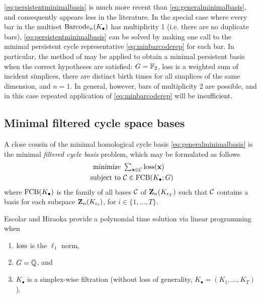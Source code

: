 \pr \eqref{eq:persistentminimalbasis} is much more recent than \pr \eqref{eq:generalminimalbasis}, and consequently appears less in the literature. In the special case where every bar in the multiset $\mathrm{Barcode}_n(K_\bullet)$ has multiplicity 1 (i.e. there are no duplicate bars), \pr \eqref{eq:persistentminimalbasis} can be solved by making one call to the minimal persistent cycle representative \pr \eqref{eq:minbarcoderep} for each bar.   In particular, the method of \cite{chenquantifying} may be applied to obtain a minimal persistent basis when the correct hypotheses are satisfied: $G = \mathbb{F}_2$, loss is a weighted sum of incident simplices, there are distinct birth times for all simplices of the same dimension, and $n=1$. In general, however, bars of multiplicity 2 are possible, and in this case repeated application of \pr \eqref{eq:minbarcoderep} will be insufficient.  

\subsection{Minimal filtered cycle space bases}

A close cousin of the minimal homological cycle basis \pr \eqref{eq:generalminimalbasis} is the minimal \emph{filtered cycle basis} problem, which may be formulated as  follows
\begin{align}
   \begin{split}
    \text{minimize } & \textstyle \sum_{\mathbf{x} \in \mathcal{C}} \mathrm{loss}(\mathbf{x}) \\
    \text{ subject to } & \mathcal{C} \in \mathrm{FCB}(K_\bullet ; G)
   \end{split}
   \label{eq:filteredminimalbasis}
\end{align}
where $\mathrm{FCB}(K_\bullet)$ is the family of all bases $\mathcal{C}$ of $\mathbf{Z}_n(K_{\epsilon_T})$ such that $\mathcal{C}$ contains a basis for each  subspace $\mathbf{Z}_n(K_{\epsilon_i})$, for $i \in \{1, \ldots, T\}$.  

Escolar and Hiraoka \cite{Escolar2016} provide a polynomial time solution via linear programming when
    \begin{enumerate}
        \item $\mathrm{loss}$ is the $\ell_1$ norm,
        \item $G = \mathbb{Q}$, and
        \item $K_\bullet$ is a simplex-wise filtration (without loss of generality, $K_\bullet = (K_1, \ldots, K_T)$).
    \end{enumerate}

